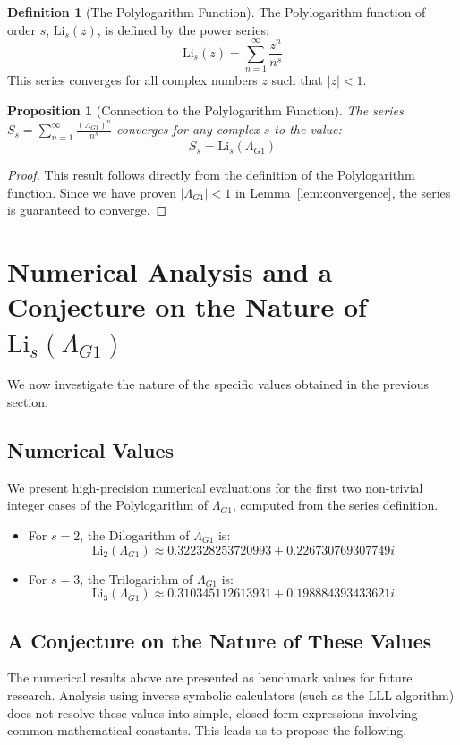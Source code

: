 \documentclass{amsart}
\theoremstyle{plain}
\newtheorem{proposition}[theorem]{Proposition}
\theoremstyle{definition}
\newtheorem{definition}[theorem]{Definition}
\theoremstyle{remark}
\newcommand{\LambdaG}{\Lambda_{G1}}
\begin{document}
\begin{definition}[The Polylogarithm Function]
The Polylogarithm function of order $s$, $\mathrm{Li}_s(z)$, is defined by the power series:
$$ \mathrm{Li}_s(z) = \sum_{n=1}^{\infty} \frac{z^n}{n^s} $$
This series converges for all complex numbers $z$ such that $|z|<1$.
\end{definition}

\begin{proposition}[Connection to the Polylogarithm Function]
The series $S_s = \sum_{n=1}^{\infty} \frac{(\LambdaG)^{n}}{n^s}$ converges for any complex $s$ to the value:
$$S_s = \mathrm{Li}_s(\LambdaG)$$
\end{proposition}
\begin{proof}
This result follows directly from the definition of the Polylogarithm function. Since we have proven $|\LambdaG| < 1$ in Lemma~\ref{lem:convergence}, the series is guaranteed to converge.
\end{proof}

\section{Numerical Analysis and a Conjecture on the Nature of \texorpdfstring{$\mathrm{Li}_s(\LambdaG)$}{Li\_s(Lambda\_G1)}}
We now investigate the nature of the specific values obtained in the previous section.

\subsection{Numerical Values}
We present high-precision numerical evaluations for the first two non-trivial integer cases of the Polylogarithm of $\LambdaG$, computed from the series definition.
\begin{itemize}
    \item For $s=2$, the Dilogarithm of $\LambdaG$ is:
    $$ \mathrm{Li}_2(\LambdaG) \approx 0.322328253720993 + 0.226730769307749i $$
    \item For $s=3$, the Trilogarithm of $\LambdaG$ is:
    $$ \mathrm{Li}_3(\LambdaG) \approx 0.310345112613931 + 0.198884393433621i $$
\end{itemize}

\subsection{A Conjecture on the Nature of These Values}
The numerical results above are presented as benchmark values for future research. Analysis using inverse symbolic calculators (such as the LLL algorithm) does not resolve these values into simple, closed-form expressions involving common mathematical constants. This leads us to propose the following.
\end{document}
